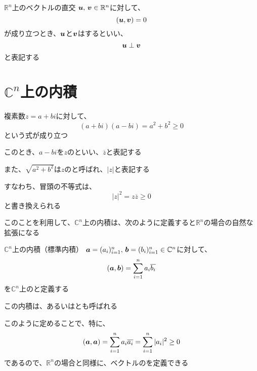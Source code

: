 \documentclass[../../../topic_linear-algebra]{subfiles}
\begin{document}
\begin{definition}{$\mathbb{R}^n$上のベクトルの直交}
  $\vb*{u},\,\vb*{v} \in \mathbb{R}^n$に対して、
  \begin{equation*}
    (\vb*{u}, \vb*{v}) = 0
  \end{equation*}
  が成り立つとき、$\vb*{u}$と$\vb*{v}$はするといい、
  \begin{equation*}
    \vb*{u} \perp \vb*{v}
  \end{equation*}
  と表記する
\end{definition}

\sectionline
\section{$\mathbb{C}^n$上の内積}

複素数$z=a+bi$に対して、
\begin{equation*}
  (a+bi)(a-bi) = a^2 + b^2 \geq 0
\end{equation*}
という式が成り立つ

このとき、$a-bi$を$z$のといい、$\overline{z}$と表記する

また、$\sqrt{a^2 + b^2}$は$z$のと呼ばれ、$|z|$と表記する

\br

すなわち、冒頭の不等式は、
\begin{equation*}
  |z|^2 = z \overline{z} \geq 0
\end{equation*}
と書き換えられる

\br

このことを利用して、$\mathbb{C}^n$上の内積は、次のように定義すると$\mathbb{R}^n$の場合の自然な拡張になる

\begin{definition}{$\mathbb{C}^n$上の内積（標準内積）}\label{def:standard-inner-product-Cn}
  $\vb*{a} = (a_i)_{i=1}^n,\, \vb*{b} = (b_i)_{i=1}^n \in \mathbb{C}^n$に対して、
  \begin{equation*}
    (\vb*{a}, \vb*{b}) = \sum_{i=1}^n a_i \overline{b_i}
  \end{equation*}
  を$\mathbb{C}^n$上のと定義する

  この内積は、あるいはとも呼ばれる
\end{definition}

このように定めることで、特に、
\begin{equation*}
  (\vb*{a}, \vb*{a}) = \sum_{i=1}^n a_i \overline{a_i} = \sum_{i=1}^n |a_i|^2 \geq 0
\end{equation*}
であるので、$\mathbb{R}^n$の場合と同様に、ベクトルのを定義できる
\end{document}
